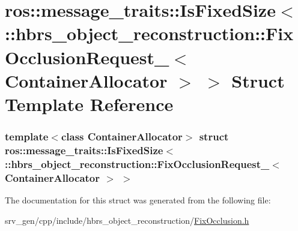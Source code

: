 \hypertarget{structros_1_1message__traits_1_1_is_fixed_size_3_01_1_1hbrs__object__reconstruction_1_1_fix_occlc5523a27954613b7d9067864be463d85}{\section{ros\-:\-:message\-\_\-traits\-:\-:\-Is\-Fixed\-Size$<$ \-:\-:hbrs\-\_\-object\-\_\-reconstruction\-:\-:\-Fix\-Occlusion\-Request\-\_\-$<$ \-Container\-Allocator $>$ $>$ \-Struct \-Template \-Reference}
\label{structros_1_1message__traits_1_1_is_fixed_size_3_01_1_1hbrs__object__reconstruction_1_1_fix_occlc5523a27954613b7d9067864be463d85}
}
\subsubsection*{template$<$class Container\-Allocator$>$ struct ros\-::message\-\_\-traits\-::\-Is\-Fixed\-Size$<$ \-::hbrs\-\_\-object\-\_\-reconstruction\-::\-Fix\-Occlusion\-Request\-\_\-$<$ Container\-Allocator $>$ $>$}



\-The documentation for this struct was generated from the following file\-:\begin{DoxyCompactItemize}
\item 
srv\-\_\-gen/cpp/include/hbrs\-\_\-object\-\_\-reconstruction/\hyperlink{_fix_occlusion_8h}{\-Fix\-Occlusion.\-h}\end{DoxyCompactItemize}
